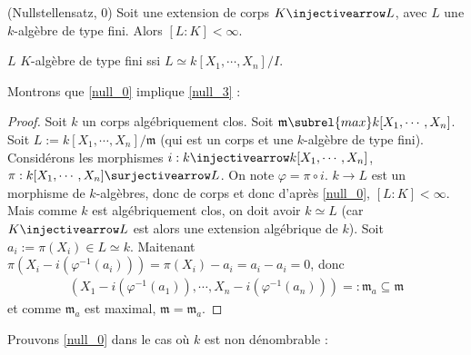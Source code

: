             \begin{theo} (Nullstellensatz, 0)
                \label{null_0}
                Soit une extension de corps $K \injectivearrow L$, avec $L$ une $k$-algèbre de type fini. Alors $[L : K] < \infty$.
            \end{theo}
            \begin{remq}
                $L$ $K$-algèbre de type fini ssi $L \simeq k[X_1, \cdots, X_n]/I$.
            \end{remq}
            Montrons que \ref{null_0} implique \ref{null_3} : 
            \begin{proof}
                Soit $k$ un corps algébriquement clos. Soit $\mathfrak{m} \subrel{max} k[X_1, \cdots, X_n]$. Soit \linebreak $L := k[X_1, \cdots, X_n]/\mathfrak{m}$ (qui est un corps et une $k$-algèbre de type fini). Considérons les morphismes $i : k \injectivearrow k[X_1, \cdots, X_n]$, $\pi : k[X_1, \cdots, X_n] \surjectivearrow L$. On note $\varphi = \pi \circ i$. $k \to L$ est un morphisme de $k$-algèbres, donc de corps et donc d'après \ref{null_0}, $[L : K] < \infty$. Mais comme $k$ est algébriquement clos, on doit avoir $k \simeq L$ (car $K \injectivearrow L$ est alors une extension algébrique de $k$). Soit $a_i := \pi(X_i) \in L \simeq k$. Maitenant $\pi(X_i - i(\varphi^{-1}(a_i))) = \pi(X_i) - a_i = a_i - a_i = 0$, donc 
                \begin{align*}
                    (X_1 - i(\varphi^{-1}(a_1)), \cdots, X_n - i(\varphi^{-1}(a_n))) =: \mathfrak{m}_a \subseteq \mathfrak{m}
                \end{align*}
                et comme $\mathfrak{m}_a$ est maximal, $\mathfrak{m} = \mathfrak{m}_a$. 
            \end{proof} \noindent
            Prouvons \ref{null_0} dans le cas où $k$ est non dénombrable :
